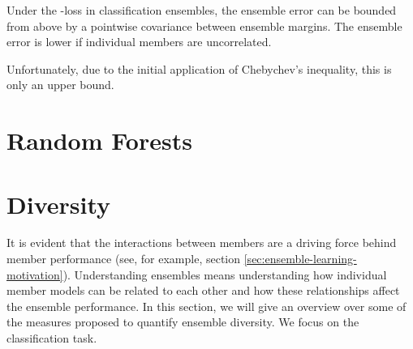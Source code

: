 \documentclass[
	twoside=false, %
]{kaobook}
\begin{document}
\begin{corollary}
Under the \zeroone-loss in classification ensembles, the ensemble error can be bounded from above by a pointwise covariance between ensemble margins. The ensemble error is lower if individual members are uncorrelated.
\end{corollary}
Unfortunately, due to the initial application of Chebychev's inequality, this is only an upper bound. 




\chapter{Random Forests}
\label{sec:random-forests}


\chapter{Diversity}
\label{sec:diversity}







It is evident that the interactions between members are a driving force behind member performance (see, for example, section \ref{sec:ensemble-learning-motivation}). Understanding ensembles means understanding how individual member models can be related to each other and how these relationships affect the ensemble performance. In this section, we will give an overview over some of the measures proposed to quantify ensemble diversity. We focus on the classification task. 
\end{document}

